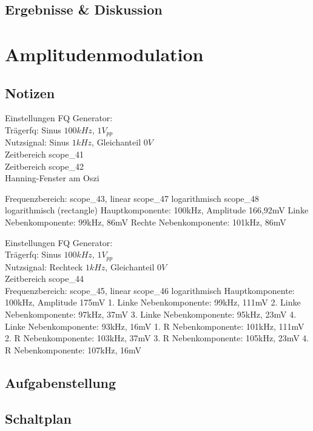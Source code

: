 \documentclass[12pt,a4paper,titlepage]{article}
\begin{document}
\subsection*{Ergebnisse \& Diskussion}



\section{Amplitudenmodulation}

\subsection*{Notizen}
Einstellungen FQ Generator: \\

Tr\"agerfq: Sinus $100kHz$, $1V_{pp}$ \\
Nutzsignal: Sinus $1kHz$, Gleichanteil $0V$ \\
Zeitbereich scope_41 \\
Zeitbereich scope_42 \\
Hanning-Fenster am Oszi

Frequenzbereich: scope_43, linear
scope_47 logarithmisch
scope_48 logarithmisch (rectangle)
Hauptkomponente: 100kHz, Amplitude 166,92mV
Linke Nebenkomponente: 99kHz, 86mV
Rechte Nebenkomponente: 101kHz, 86mV

Einstellungen FQ Generator: \\
Tr\"agerfq: Sinus $100kHz$, $1V_{pp}$ \\
Nutzsignal: Rechteck $1kHz$, Gleichanteil $0V$ \\
Zeitbereich scope_44 \\

Frequenzbereich: scope_45, linear
scope_46 logarithmisch
Hauptkomponente: 100kHz, Amplitude 175mV
1. Linke Nebenkomponente: 99kHz, 111mV
2. Linke Nebenkomponente: 97kHz, 37mV
3. Linke Nebenkomponente: 95kHz, 23mV
4. Linke Nebenkomponente: 93kHz, 16mV
1. R Nebenkomponente: 101kHz, 111mV
2. R Nebenkomponente: 103kHz, 37mV
3. R Nebenkomponente: 105kHz, 23mV
4. R Nebenkomponente: 107kHz, 16mV


\subsection*{Aufgabenstellung}

\subsection*{Schaltplan}
\end{document}
